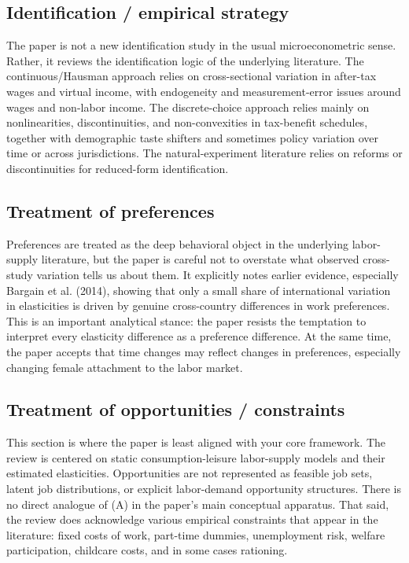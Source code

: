 \documentclass[11pt,a4paper]{article}
\begin{document}
\subsection*{Identification / empirical strategy}
The paper is not a new identification study in the usual microeconometric sense. Rather, it reviews the identification logic of the underlying literature. The continuous/Hausman approach relies on cross-sectional variation in after-tax wages and virtual income, with endogeneity and measurement-error issues around wages and non-labor income. The discrete-choice approach relies mainly on nonlinearities, discontinuities, and non-convexities in tax-benefit schedules, together with demographic taste shifters and sometimes policy variation over time or across jurisdictions. The natural-experiment literature relies on reforms or discontinuities for reduced-form identification.

\subsection*{Treatment of preferences}
Preferences are treated as the deep behavioral object in the underlying labor-supply literature, but the paper is careful not to overstate what observed cross-study variation tells us about them. It explicitly notes earlier evidence, especially Bargain et al. (2014), showing that only a small share of international variation in elasticities is driven by genuine cross-country differences in work preferences. This is an important analytical stance: the paper resists the temptation to interpret every elasticity difference as a preference difference. At the same time, the paper accepts that time changes may reflect changes in preferences, especially changing female attachment to the labor market.

\subsection*{Treatment of opportunities / constraints}
This section is where the paper is least aligned with your core framework. The review is centered on static consumption-leisure labor-supply models and their estimated elasticities. Opportunities are not represented as feasible job sets, latent job distributions, or explicit labor-demand opportunity structures. There is no direct analogue of (A) in the paper’s main conceptual apparatus. That said, the review does acknowledge various empirical constraints that appear in the literature: fixed costs of work, part-time dummies, unemployment risk, welfare participation, childcare costs, and in some cases rationing.
\end{document}
